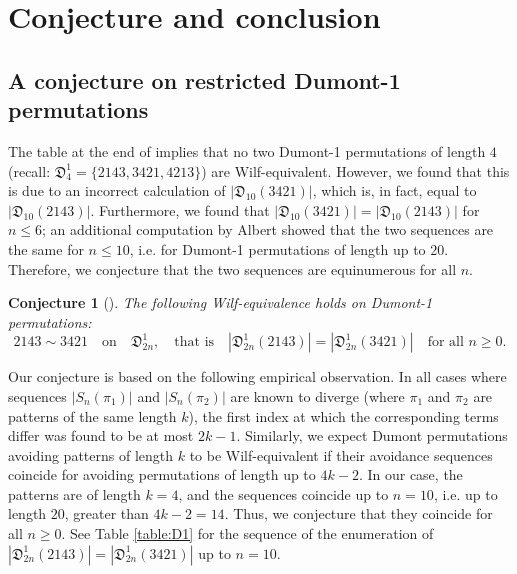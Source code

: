 \documentclass[
final
]{dmtcs-episciences}
\newtheorem{conjecture}[theorem]{Conjecture}
\theoremstyle{definition}
\theoremstyle{remark}
\begin{document}



\section{Conjecture and conclusion}

\subsection {A conjecture on restricted Dumont-1 permutations}
\label {B-J Conjecture}

The table at the end of \cite[Section 3.1]{Burstein_Restricted} implies that no two Dumont-1 permutations of length $4$ (recall: $\mathfrak{D}^1_4 = \{2143, 3421, 4213\}$) are Wilf-equivalent.  However, we found that this is due to an incorrect calculation of $|\mathfrak{D}_{10}(3421)|$, which is, in fact, equal to $|\mathfrak{D}_{10}(2143)|$. Furthermore, we found that $|\mathfrak{D}_{10}(3421)|=|\mathfrak{D}_{10}(2143)|$ for $n \le 6$; an additional computation by Albert \cite{Albert_comm} showed that the two sequences are the same for $n\le 10$, i.e. for Dumont-1 permutations of length up to $20$.  Therefore, we conjecture that the two sequences are equinumerous for all $n$.

\begin{conjecture}[\cite{Burstein_Jones}]
The following Wilf-equivalence holds on Dumont-1 permutations:
\[
2143 \sim 3421 \quad \text{on} \quad \mathfrak{D}^1_{2n}, \quad \text{that is} \quad |\mathfrak{D}^1_{2n} (2143)| = |\mathfrak{D}^1_{2n} (3421)| \quad \text{for all $n\ge 0$}.
\]
\end{conjecture}

Our conjecture is based on the following empirical observation. In all cases where sequences $|S_n(\pi_1)|$ and $|S_n(\pi_2)|$ are known to diverge (where $\pi_1$ and $\pi_2$ are patterns of the same length $k$), the first index at which the corresponding terms differ was found to be at most $2k-1$. Similarly, we expect Dumont permutations avoiding patterns of length $k$ to be Wilf-equivalent if their avoidance sequences coincide for avoiding permutations of length up to $4k-2$. In our case, the patterns are of length $k=4$, and the sequences coincide up to $n=10$, i.e. up to length $20$, greater than $4k-2=14$. Thus, we conjecture that they coincide for all $n\ge 0$.  See Table \ref{table:D1} for the sequence of the enumeration of $|\mathfrak{D}^1_{2n} (2143)| = |\mathfrak{D}^1_{2n} (3421)|$ up to $n = 10$.
\end{document}
